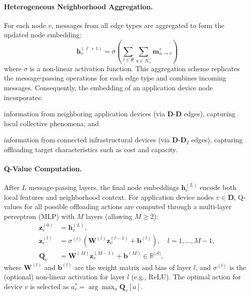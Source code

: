 \paragraph{Heterogeneous Neighborhood Aggregation.}
For each node $v$, messages from all edge types are aggregated to form the updated node embedding:
\begin{equation}\label{eq:aggregation}
    \mathbf{h}^{(\ell+1)}_v = \sigma\left( \sum_{\tau \in \Psi} \sum_{u \in \mathcal{N}^\tau_v} \mathbf{m}^\tau_{u \to v} \right)
\end{equation}
where $\sigma$ is a non-linear activation function.
%
This aggregation scheme replicates the message-passing operations 
 for each edge type and combines incoming messages.
%
Consequently, 
 the embedding of an application device node incorporates:
\begin{enumerate*}[label=(\roman*)]
  \item information from neighboring application devices (via $\mathbf{D}\text{-}\mathbf{D}$ edges), capturing local collective phenomena; and
  \item information from connected infrastructural devices (via $\mathbf{D}\text{-}\mathbf{D}_I$ edges), capturing offloading target characteristics such as cost and capacity.
\end{enumerate*}

\paragraph{Q-Value Computation.}
After $L$ message-passing layers, 
 the final node embeddings $\mathbf{h}^{(L)}_v$ encode both local features and neighborhood context.
%
For application device nodes $v \in \mathbf{D}$, 
 Q-values for all possible offloading actions are computed through a multi-layer perceptron (MLP) with $M$ layers (allowing $M\ge 2$):
\[
\begin{aligned}
\mathbf{z}_v^{(0)} &= \mathbf{h}^{(L)}_v,\\
\mathbf{z}_v^{(l)} &= \sigma^{(l)}\!\left(\mathbf{W}^{(l)}\mathbf{z}_v^{(l-1)} + \mathbf{b}^{(l)}\right), \quad l=1,\dots,M-1,\\
\mathbf{Q}_v &= \mathbf{W}^{(M)}\mathbf{z}_v^{(M-1)} + \mathbf{b}^{(M)} \in \mathbb{R}^{|\mathcal{A}|},
\end{aligned}
\]
where $\mathbf{W}^{(l)}$ and $\mathbf{b}^{(l)}$ are the weight matrix and bias of layer $l$, 
 and $\sigma^{(l)}$ is the (optional) non-linear activation for layer $l$ (e.g., ReLU). 
% 
The optimal action for device $v$ is selected as $a^*_v = \arg\max_a \mathbf{Q}_v[a]$.

